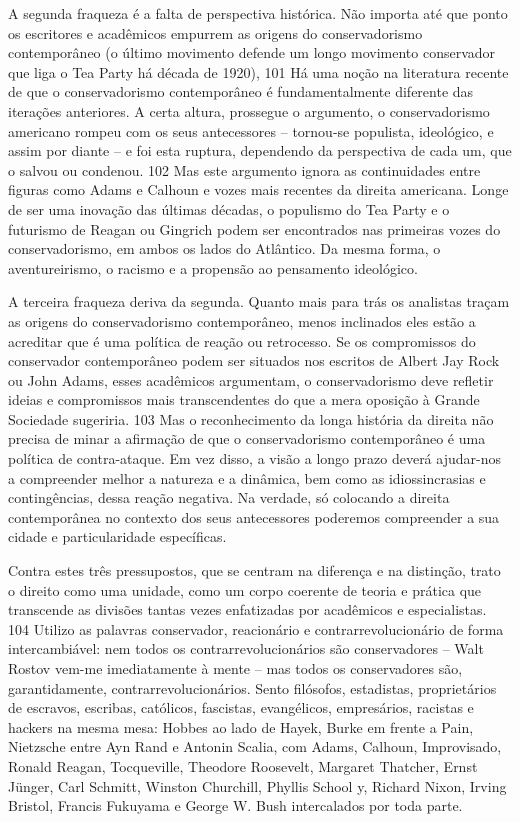 A segunda fraqueza é a falta de perspectiva histórica. Não importa até que ponto os escritores e acadêmicos empurrem as origens do conservadorismo contemporâneo (o último movimento defende um longo movimento conservador que liga o Tea Party há década de 1920),
 {\color{blue} 101}  
Há uma noção na literatura recente de que o conservadorismo contemporâneo é fundamentalmente diferente das iterações anteriores. A certa altura, prossegue o argumento, o conservadorismo americano rompeu com os seus antecessores – tornou-se populista, ideológico, e assim por diante – e foi esta ruptura, dependendo da perspectiva de cada um, que o salvou ou condenou.
 {\color{blue} 102}  
Mas este argumento ignora as continuidades entre figuras como Adams e Calhoun e vozes mais recentes da direita americana. Longe de ser uma inovação das últimas décadas, o populismo do Tea Party e o futurismo de Reagan ou Gingrich podem ser encontrados nas primeiras vozes do conservadorismo, em ambos os lados do Atlântico. Da mesma forma, o aventureirismo, o racismo e a propensão ao pensamento ideológico.
 
\par
 
A terceira fraqueza deriva da segunda. Quanto mais para trás os analistas traçam as origens do conservadorismo contemporâneo, menos inclinados eles estão a acreditar que é uma política de reação ou retrocesso. Se os compromissos do conservador contemporâneo podem ser situados nos escritos de Albert Jay Rock ou John Adams, esses acadêmicos argumentam, o conservadorismo deve refletir ideias e compromissos mais transcendentes do que a mera oposição à Grande Sociedade sugeriria.
 {\color{blue} 103}  
Mas o reconhecimento da longa história da direita não precisa de minar a afirmação de que o conservadorismo contemporâneo é uma política de contra-ataque. Em vez disso, a visão a longo prazo deverá ajudar-nos a compreender melhor a natureza e a dinâmica, bem como as idiossincrasias e contingências, dessa reação negativa. Na verdade, só colocando a direita contemporânea no contexto dos seus antecessores poderemos compreender a sua cidade e particularidade específicas.
 
\par
 
Contra estes três pressupostos, que se centram na diferença e na distinção, trato o direito como uma unidade, como um corpo coerente de teoria e prática que transcende as divisões tantas vezes enfatizadas por acadêmicos e especialistas.
 {\color{blue} 104}  
Utilizo as palavras conservador, reacionário e contrarrevolucionário de forma intercambiável: nem todos os contrarrevolucionários são conservadores – Walt Rostov vem-me imediatamente à mente – mas todos os conservadores são, garantidamente, contrarrevolucionários. Sento filósofos, estadistas, proprietários de escravos, escribas, católicos, fascistas, evangélicos, empresários, racistas e hackers na mesma mesa: Hobbes ao lado de Hayek, Burke em frente a Pain, Nietzsche entre Ayn Rand e Antonin Scalia, com Adams, Calhoun, Improvisado, Ronald Reagan, Tocqueville, Theodore Roosevelt, Margaret Thatcher, Ernst Jünger, Carl Schmitt, Winston Churchill, Phyllis School y, Richard Nixon, Irving Bristol, Francis Fukuyama e George W. Bush intercalados por toda parte.
 
